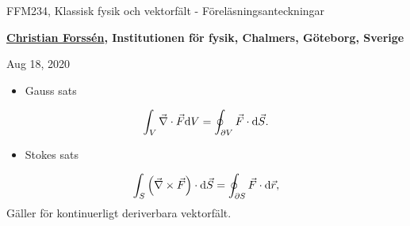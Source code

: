 \documentclass[%
oneside,                 %
final,                   %
10pt]{article}
\newenvironment{summary_mdfboxadmon}[1][]{
\begin{summary_mdfboxmdframed}[frametitle=#1]
}
{
\end{summary_mdfboxmdframed}
}
\begin{document}

\newcommand{\exercisesection}[1]{\subsection*{#1}}







\thispagestyle{empty}

\begin{center}
{\LARGE\bf
\begin{spacing}{1.25}
FFM234, Klassisk fysik och vektorfält - Föreläsningsanteckningar
\end{spacing}
}
\end{center}


\begin{center}
{\bf \href{{http://fy.chalmers.se/subatom/tsp/}}{Christian Forssén}, Institutionen för fysik, Chalmers, Göteborg, Sverige${}^{}$} \\ [0mm]
\end{center}

\begin{center}
\end{center}
    

\begin{center}
Aug 18, 2020
\end{center}

\vspace{1cm}



\begin{summary_mdfboxadmon}
\begin{itemize}
\item Gauss sats
\end{itemize}

\noindent
\begin{equation}
  \int_V \vec{\nabla} \cdot \vec{F} \mbox{d}V = \oint_{\partial V} \vec{F} \cdot \mbox{d} \vec{S}.
\end{equation}
\begin{itemize}
\item Stokes sats
\end{itemize}

\noindent
\begin{equation}
  \int_S \left( \vec{\nabla} \times \vec{F}\right) \cdot \mbox{d}\vec{S} = \oint_{\partial S} \vec{F}\cdot
\mbox{d}\vec{r},
\end{equation}
Gäller för kontinuerligt deriverbara vektorfält.
\end{summary_mdfboxadmon} %
\end{document}

